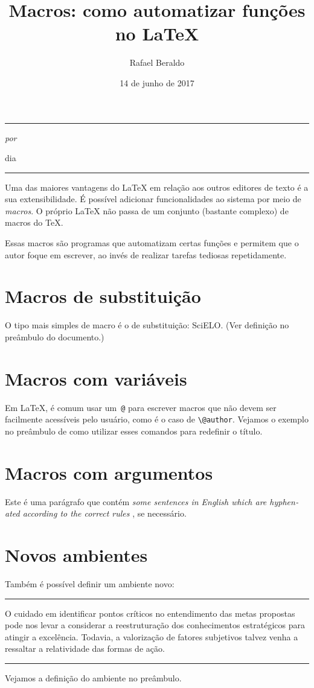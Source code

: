 \documentclass[a4paper]{article}
\title{Macros: como automatizar funções no \LaTeX}
\author{Rafael Beraldo}
\date{14 de junho de 2017}
\makeatletter
\newcommand{\scielo}{SciELO\xspace}
\newcommand{\eng}[1]{%
  \emph{\textenglish{#1}}%
}
\newenvironment{spotlight}
{
  \vspace{1em}
  \noindent\rule{\linewidth}{.5pt}\par\vspace{5pt}
  \noindent\ignorespaces
}
{
  \par
  \noindent\rule{\linewidth}{.5pt}
  \vspace{1em}\ignorespacesafterend
}
\renewcommand{\maketitle}{
  \begin{flushleft}
    \sffamily
    {\rule{\linewidth}{1pt}}
    {\Large\bfseries\@title\par}
    \medskip
    {\color{darkgray}\large\itshape por \@author{}\par
    dia \@date \par}
    {\rule{\linewidth}{1pt}}
    \bigskip
  \end{flushleft}
}
\makeatother
\begin{document}
\frenchspacing

\maketitle

Uma das maiores vantagens do \LaTeX{} em relação aos outros editores de texto é
a sua extensibilidade. É possível adicionar funcionalidades ao sistema por meio
de \emph{macros}. O próprio \LaTeX{} não passa de um conjunto (bastante
complexo) de macros do \TeX.

Essas macros são programas que automatizam certas funções e permitem que o
autor foque em escrever, ao invés de realizar tarefas tediosas repetidamente.

\section{Macros de substituição}

O tipo mais simples de macro é o de substituição: \scielo. (Ver definição
no preâmbulo do documento.)

\section{Macros com variáveis}

Em \LaTeX, é comum usar um~\verb+@+ para escrever macros que não devem ser
facilmente acessíveis pelo usuário, como é o caso de \verb+\@author+. Vejamos o
exemplo no preâmbulo de como utilizar esses comandos para redefinir o título.

\section{Macros com argumentos}

Este é uma parágrafo que contém \eng{some sentences in English which are
hyphenated according to the correct rules}, se necessário.

\section{Novos ambientes}

Também é possível definir um ambiente novo:

\begin{spotlight}
  O cuidado em identificar pontos críticos no entendimento das metas propostas
  pode nos levar a considerar a reestruturação dos conhecimentos estratégicos
  para atingir a excelência. Todavia, a valorização de fatores subjetivos
  talvez venha a ressaltar a relatividade das formas de ação.
\end{spotlight}

Vejamos a definição do ambiente no preâmbulo.
\end{document}
